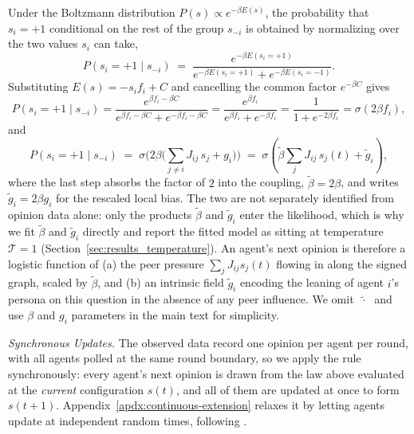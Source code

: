 Under the Boltzmann distribution $P(s) \propto e^{-\beta E(s)}$, the probability that $s_i = +1$ conditional on the rest of the group $s_{-i}$ is obtained by normalizing over the two
values $s_i$ can take,
\[
P(s_i = +1 \mid s_{-i})
\;=\; \frac{e^{-\beta E(s_i=+1)}}{e^{-\beta E(s_i=+1)} + e^{-\beta E(s_i=-1)}} .
\]
Substituting $E(s) = -s_i f_i + C$ and cancelling the common factor $e^{-\beta C}$ gives
\[
P(s_i=+1\mid s_{-i})
= \frac{e^{\beta f_i - \beta C}}{e^{\beta f_i - \beta C} + e^{-\beta f_i - \beta C}}
= \frac{e^{\beta f_i}}{e^{\beta f_i} + e^{-\beta f_i}}
= \frac{1}{1 + e^{-2\beta f_i}}
= \sigma\!\left(2\beta f_i\right),
\]
and
\[
P(s_i=+1\mid s_{-i})
\;=\; \sigma\!\Big(2\beta \big(\textstyle\sum_{j\neq i} J_{ij}\,s_j + g_i\big)\Big)
\;=\; \sigma\!\left(\tilde\beta \sum_{j} J_{ij}\,s_j(t) + \tilde g_i\right),
\]
where the last step absorbs the factor of $2$ into the coupling, $\tilde\beta = 2\beta$, and
writes $\tilde g_i = 2\beta g_i$ for the rescaled local bias. The two are not separately
identified from opinion data alone: only the products $\tilde\beta$ and $\tilde g_i$ enter the
likelihood, which is why we fit $\tilde\beta$ and $\tilde g_i$ directly and report the fitted
model as sitting at temperature $\mathcal{T} = 1$ (Section~\ref{sec:results_temperature}). An agent's
next opinion is therefore a logistic function of (a) the peer pressure
$\sum_j J_{ij}s_j(t)$ flowing in along the signed graph, scaled by $\tilde\beta$, and (b) an
intrinsic field $\tilde g_i$ encoding the leaning of agent $i$'s persona on this question in
the absence of any peer influence. We omit $\;\tilde{\cdot}\;$ and use $\beta$ and $g_i$ parameters in the main text for simplicity.

\textit{Synchronous Updates.} The observed data record one opinion per agent per round, with
all agents polled at the same round boundary, so we apply the rule synchronously: every agent's
next opinion is drawn from the law above evaluated at the \emph{current} configuration
$s(t)$, and all of them are updated at once to form $s(t+1)$. Appendix~\ref{apdx:continuous-extension} relaxes it by letting agents update at
independent random times, following  \citet{glauber1963}.
